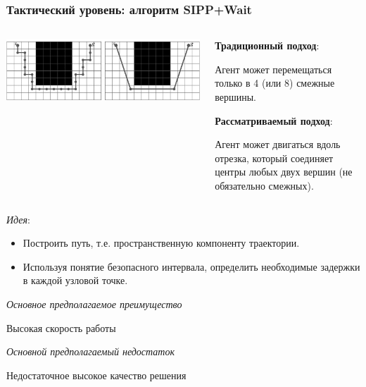 \documentclass[default]{beamer}
\begin{document}
	\begin{frame}
		\frametitle{Тактический уровень: алгоритм SIPP+Wait}
		\scriptsize
		\begin{columns}
			\begin{column}{0.6\textwidth}
				\includegraphics[width=\textwidth]{sipp.png}
			\end{column}
			\begin{column}{0.4\textwidth}
				\textbf{Традиционный подход}:
				
				Агент может перемещаться только в 4 (или 8) смежные вершины.
				\par\medskip
				\textbf{Рассматриваемый подход}:
				
				Агент может двигаться вдоль отрезка, который соединяет центры любых двух вершин (не обязательно смежных).
				
			\end{column}
		\end{columns}
		\par\medskip
		\small
		\textit{Идея}:
		\begin{itemize}
			\item Построить путь, т.е. пространственную компоненту траектории.
			\item Используя понятие безопасного интервала, определить необходимые задержки в каждой узловой точке.
		\end{itemize}
		
		
		\textit{Основное предполагаемое преимущество}
		
		\quad Высокая скорость работы
		
		\textit{Основной предполагаемый недостаток}

		\quad Недостаточное высокое качество решения
		
	\end{frame}
\end{document}
